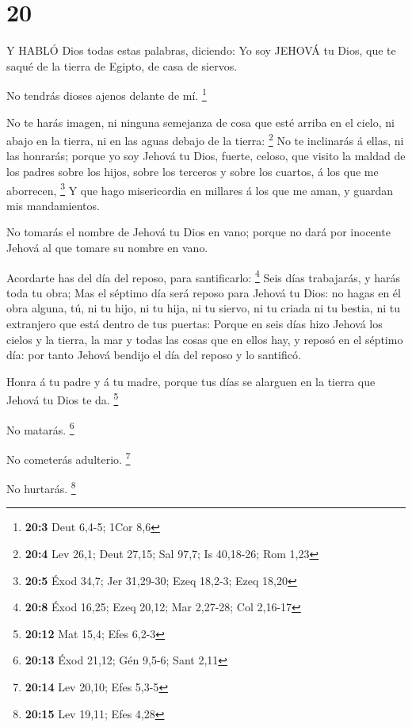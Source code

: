\hypertarget{section-19}{%
\section{20}\label{section-19}}

 Y HABLÓ Dios todas estas palabras, diciendo: 
Yo soy JEHOVÁ tu Dios, que te saqué de la tierra de Egipto, de casa de
siervos.

 No tendrás dioses ajenos delante de mí. \footnote{\textbf{20:3}
  Deut 6,4-5; 1Cor 8,6}

 No te harás imagen, ni ninguna semejanza de cosa que esté
arriba en el cielo, ni abajo en la tierra, ni en las aguas debajo de la
tierra: \footnote{\textbf{20:4} Lev 26,1; Deut 27,15; Sal 97,7; Is
  40,18-26; Rom 1,23}  No te inclinarás á ellas, ni las
honrarás; porque yo soy Jehová tu Dios, fuerte, celoso, que visito la
maldad de los padres sobre los hijos, sobre los terceros y sobre los
cuartos, á los que me aborrecen, \footnote{\textbf{20:5} Éxod 34,7; Jer
  31,29-30; Ezeq 18,2-3; Ezeq 18,20}  Y que hago
misericordia en millares á los que me aman, y guardan mis mandamientos.

 No tomarás el nombre de Jehová tu Dios en vano; porque no
dará por inocente Jehová al que tomare su nombre en vano.

 Acordarte has del día del reposo, para santificarlo:
\footnote{\textbf{20:8} Éxod 16,25; Ezeq 20,12; Mar 2,27-28; Col 2,16-17}
 Seis días trabajarás, y harás toda tu obra; 
Mas el séptimo día será reposo para Jehová tu Dios: no hagas en él obra
alguna, tú, ni tu hijo, ni tu hija, ni tu siervo, ni tu criada ni tu
bestia, ni tu extranjero que está dentro de tus puertas: 
Porque en seis días hizo Jehová los cielos y la tierra, la mar y todas
las cosas que en ellos hay, y reposó en el séptimo día: por tanto Jehová
bendijo el día del reposo y lo santificó.

 Honra á tu padre y á tu madre, porque tus días se alarguen
en la tierra que Jehová tu Dios te da. \footnote{\textbf{20:12} Mat
  15,4; Efes 6,2-3}

 No matarás. \footnote{\textbf{20:13} Éxod 21,12; Gén
  9,5-6; Sant 2,11}

 No cometerás adulterio. \footnote{\textbf{20:14} Lev
  20,10; Efes 5,3-5}

 No hurtarás. \footnote{\textbf{20:15} Lev 19,11; Efes 4,28}

